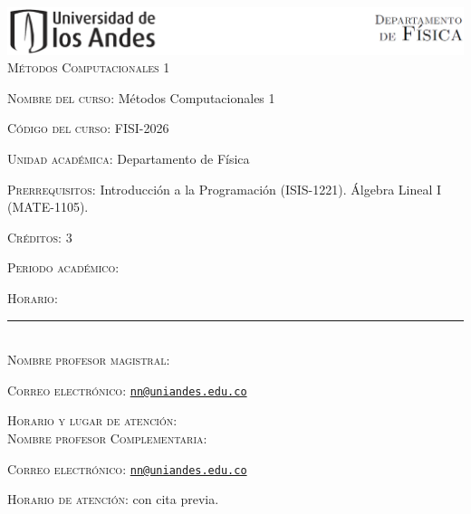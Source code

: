 \documentclass[letterpaper,10pt,onecolumn]{article}
\begin{document}
\begin{center}

\includegraphics[width=490pt]{header.png}\\[0.5cm]

\textsc{\LARGE M\'etodos Computacionales 1}\\[0.1cm]

\end{center}

\large \noindent\textsc{Nombre del curso:}  M\'etodos Computacionales 1 %
  
\noindent\textsc{C\'odigo del curso:}  FISI-2026 %

\noindent\textsc{Unidad acad\'emica:} Departamento de F\'isica

\noindent\textsc{Prerrequisitos}: Introducci\'on a la Programaci\'on (ISIS-1221). \'Algebra Lineal I (MATE-1105).

\noindent\textsc{Cr\'editos}: 3

\noindent\textsc{Periodo acad\'emico:} %

\noindent\textsc{Horario:}

\noindent\rule{\textwidth}{1pt}\\[-0.3cm]

\normalsize \noindent\textsc{Nombre profesor magistral:}

\noindent\textsc{Correo electr\'onico:}
\href{mailto:nn@uniandes.edu.co}{\nolinkurl{nn@uniandes.edu.co}}

\noindent\textsc{Horario y lugar de atenci\'on:} 
\\[-0.1cm]




\normalsize \noindent\textsc{Nombre profesor Complementaria:}

\noindent\textsc{Correo electr\'onico:}
\href{mailto:nn@uniandes.edu.co}{\nolinkurl{nn@uniandes.edu.co}}

\noindent\textsc{Horario de atenci\'on:} con cita previa. 
\\[-0.1cm]
\end{document}
